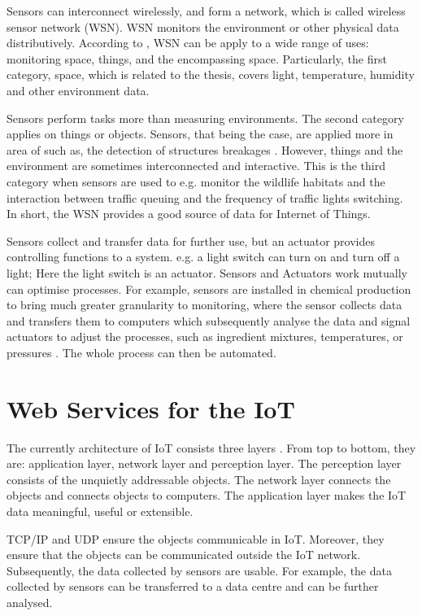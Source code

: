 Sensors can interconnect wirelessly, and form a network, which is called wireless sensor network (WSN). WSN monitors the environment or other physical data distributively. According to \cite{culler2004guest}, WSN can be apply to a wide range of uses: monitoring space, things, and the encompassing space. Particularly, the first category, space, which is related to the thesis, covers light, temperature, humidity and other environment data. 

Sensors perform tasks more than measuring environments. The second category applies on things or objects. Sensors, that being the case, are applied more in area of such as, the detection of structures breakages \cite{christin2009wireless}. However, things and the environment are sometimes interconnected and interactive. This is the third category when sensors are used to e.g. monitor the wildlife habitats \cite{culler2004guest} and the interaction between traffic queuing and the frequency of traffic lights switching. In short, the WSN provides a good source of data for Internet of Things.

Sensors collect and transfer data for further use, but an actuator provides controlling functions to a system. e.g. a light switch can turn on and turn off a light; Here the light switch is an actuator. Sensors and Actuators work mutually can optimise processes. For example, sensors are installed in chemical production to bring much greater granularity to monitoring, where the sensor collects data and transfers them to computers which subsequently analyse the data and signal actuators to adjust the processes, such as ingredient mixtures, temperatures, or pressures \cite{chui2010internet}. The whole process can then be automated. 

\section{Web Services for the IoT}
The currently architecture of IoT consists three layers \cite{wu2010research}. From top to bottom, they are: application layer, network layer and perception layer. The perception layer consists of the unquietly addressable objects. The network layer connects the objects and connects objects to computers. The application layer makes the IoT data meaningful, useful or extensible.

TCP/IP and UDP ensure the objects communicable in IoT. Moreover, they ensure that the objects can be communicated outside the IoT network. Subsequently, the data collected by sensors are usable. For example, the data collected by sensors can be transferred to a data centre and can be further analysed. 

